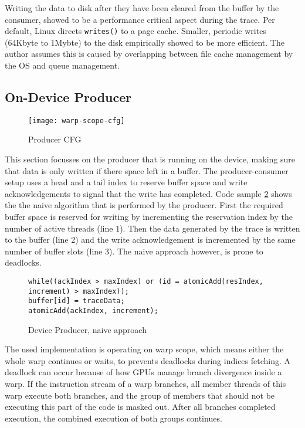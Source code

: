 	Writing the data to disk after they have been cleared from the buffer by the consumer, showed to be a performance critical aspect during the trace. Per default, Linux directs \verb|writes()| to a page cache. Smaller, periodic writes (64Kbyte to 1Mybte) to the disk empirically showed to be more efficient. The author assumes this is caused by overlapping between file cache management by the OS and queue management.
	
	\subsection{On-Device Producer}\label{ondevprod}
\begin{figure}[t]
	\centering
	\texttt{[image: warp-scope-cfg]}
	\caption{Producer CFG}
\label{wscfg}
\end{figure}	
	This section focusses on the producer that is running on the device, making sure that data is only written if there space left
	in a buffer. The producer-consumer setup uses a head and a tail index to reserve buffer space and write acknowledgements to signal that the write has completed. Code sample \ref{prod-cons} shows the the naive algorithm that is performed by the producer. First the required buffer space is reserved for writing by incrementing the reservation index
	by the number of active threads (line 1). Then the data generated by the trace is
	written to the buffer (line 2) and the write acknowledgement is incremented by the same number of buffer slots (line 3). The naive approach however, is prone to deadlocks.
\begin{figure}
	\begin{lstlisting}[style=C]
while((ackIndex > maxIndex) or (id = atomicAdd(resIndex, increment) > maxIndex));
buffer[id] = traceData;
atomicAdd(ackIndex, increment);
\end{lstlisting}
	\caption{Device Producer, naive approach}
	\label{prod-cons}
\end{figure}

	
	The used implementation is operating on warp scope, which means either the whole warp continues or waits, to prevents deadlocks during indices fetching.
	A deadlock can occur because of how GPUs manage branch divergence inside a warp. If the instruction stream of a warp branches, all member threads of this warp execute both branches, and the group of members that should not be executing this part of the code is masked out. After all branches completed execution, the combined execution of both groups continues.
	
